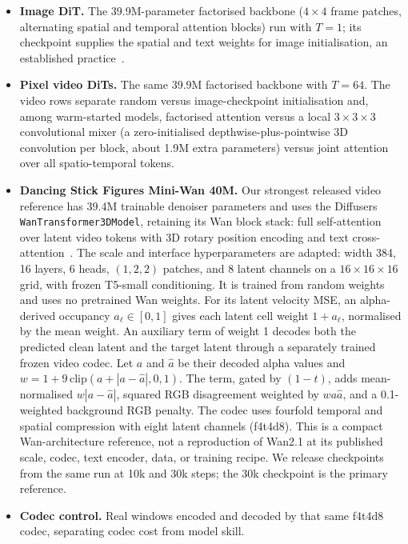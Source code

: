 \documentclass[10pt,twocolumn]{article}
\begin{document}
\begin{itemize}[leftmargin=*,nosep]
\item \textbf{Image DiT.} The 39.9M-parameter factorised backbone ($4\times4$ frame patches, alternating
spatial and temporal attention blocks) run with $T{=}1$; its checkpoint supplies the spatial and text
weights for image initialisation, an established practice~\cite{ho2022vdm,singer2023makeavideo}.
\item \textbf{Pixel video DiTs.} The same 39.9M factorised backbone with $T{=}64$. The video rows separate
random versus image-checkpoint initialisation and, among warm-started models, factorised attention versus a
local $3{\times}3{\times}3$ convolutional mixer (a zero-initialised depthwise-plus-pointwise 3D convolution
per block, about 1.9M extra parameters) versus joint attention over all spatio-temporal tokens.
\item \textbf{Dancing Stick Figures Mini-Wan 40M.} Our strongest released video reference has 39.4M
trainable denoiser parameters and uses the Diffusers \texttt{WanTransformer3DModel}, retaining its Wan block
stack: full self-attention over latent video tokens with 3D rotary position encoding and text
cross-attention~\cite{wan2025}. The scale and interface
hyperparameters are adapted: width 384, 16 layers, 6 heads, $(1,2,2)$ patches, and 8 latent channels on a
$16\times16\times16$ grid, with frozen T5-small conditioning. It is trained from random weights and uses no
pretrained Wan weights. For its latent velocity MSE, an alpha-derived occupancy $a_\ell\in[0,1]$ gives each
latent cell weight $1+a_\ell$, normalised by the mean weight. An auxiliary term of weight 1 decodes both
the predicted clean latent and the target latent through a separately trained frozen video codec. Let
$a$ and $\hat a$ be their decoded alpha values and $w=1+9\,\mathrm{clip}(a+|a-\hat a|,0,1)$. The term,
gated by $(1-t)$, adds mean-normalised $w|a-\hat a|$, squared RGB disagreement weighted by
$wa\hat a$, and a 0.1-weighted background RGB penalty. The codec uses fourfold temporal and spatial
compression with eight latent channels (f4t4d8). This is a compact Wan-architecture reference, not a
reproduction of Wan2.1 at its published scale, codec, text encoder, data, or training recipe. We release checkpoints from
the same run at 10k and 30k steps; the 30k checkpoint is the primary reference.
\item \textbf{Codec control.} Real windows encoded and decoded by that same f4t4d8 codec, separating codec
cost from model skill.
\end{itemize}
\end{document}
